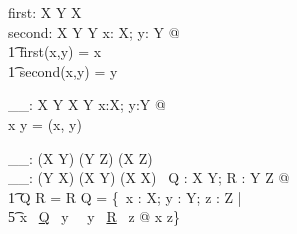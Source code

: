 \documentclass[../main.tex]{subfiles}
\begin{document}
\begin{gendef}[X,Y]
  first: X \cross Y \fun X \\
  second: X \cross Y \fun Y
  \where
  \forall x: X; y: Y @ \\
  \t1 first(x,y) = x \ \land \\
  \t1 second(x,y) = y
\end{gendef}

\begin{gendef}[X,Y]
  \_\mapsto\_: X \cross Y \fun X \cross Y
  \where
  \forall x:X; y:Y @ \\
  x \mapsto y = (x, y)
\end{gendef}

\begin{gendef}[X,Y,Z]
  \_\comp\_: (X \rel Y) \cross (Y \rel Z) \fun (X \rel Z) \\
  \_\circ\_: (Y \rel X) \cross (X \rel Y) \fun (X \rel X)
  \where
  \forall ~Q : X \rel Y; R : Y \rel Z @ \\
  \t1 Q \comp R = R \circ Q = \{~x : X; y : Y; z : Z | \\
  \t5  x ~\underline{Q} ~y \ \land \ y ~\underline{R} ~z @ x \mapsto z\}
\end{gendef}
\end{document}
